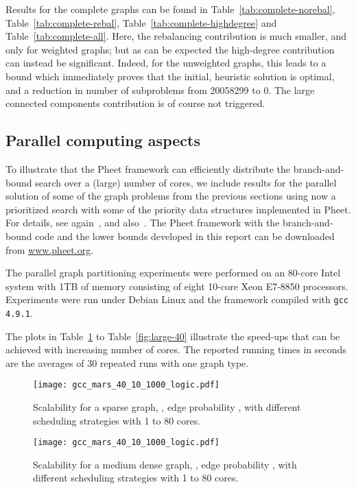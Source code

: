 \documentclass[a4paper,11pt]{article}
\begin{document}
Results for the complete graphs can be found in
Table~\ref{tab:complete-norebal}, Table~\ref{tab:complete-rebal},
Table~\ref{tab:complete-highdegree} and Table~\ref{tab:complete-all}.
Here, the rebalancing contribution is much smaller, and only for
weighted graphs; but as can be expected the high-degree contribution
can instead be significant. Indeed, for the unweighted graphs, this
leads to a bound which immediately proves that the initial, heuristic
solution is optimal, and a reduction in number of subproblems from
20058299 to 0. The large connected components contribution is of
course not triggered.

\subsection{Parallel computing aspects}

To illustrate that the Pheet framework can efficiently distribute the
branch-and-bound search over a (large) number of cores, we include
results for the parallel solution of some of the graph problems from
the previous sections using now a prioritized search with some of the
priority data structures implemented in Pheet. For details, see
again~\cite{Wimmer14:diss}, and
also~\cite{Traff13:priosched,Traff13:stratcorr}. The Pheet framework
with the branch-and-bound code and the lower bounds developed in this
report can be downloaded from \url{www.pheet.org}.

The parallel graph partitioning experiments were performed on an
80-core Intel system with 1TB of memory consisting of eight 10-core
Xeon E7-8850 processors. Experiments were run under Debian Linux and
the framework compiled with \texttt{gcc 4.9.1}.

The plots in Table~\ref{fig:sparse-60} to Table~\ref{fig:large-40}
illustrate the speed-ups that can be achieved with increasing number
of cores. The reported running times in seconds are the averages of 30
repeated runs with one graph type.

\begin{figure}
  \texttt{[image: gcc\_mars\_40\_10\_1000\_logic.pdf]}
\caption{Scalability for a sparse graph, , edge probability
  ,  with different scheduling strategies with
  1 to 80 cores.}
\label{fig:sparse-60}
\end{figure}

\begin{figure}
  \texttt{[image: gcc\_mars\_40\_10\_1000\_logic.pdf]}
\caption{Scalability for a medium dense graph, , edge probability
  ,  with different scheduling strategies with
  1 to 80 cores.}
\label{fig:medium-45}
\end{figure}
\end{document}
